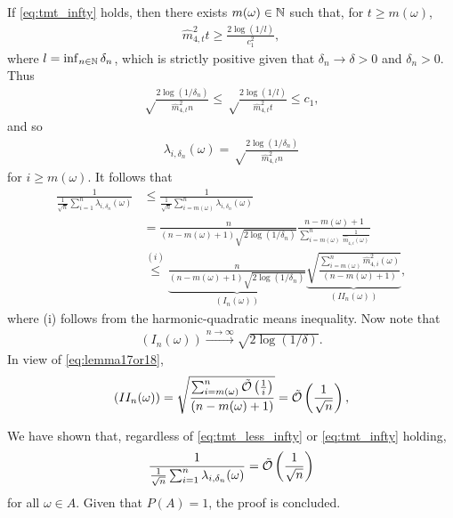     If \eqref{eq:tmt_infty} holds, then there exists $m(\omega) \in \mathbb{N}$ such that, for $t \geq m(\omega)$, 
    \begin{align*}
        \widehat m_{4, t}^2 t \geq \frac{2\log(1/l)}{c_1^2},
    \end{align*}
    where $l = \inf_{n \in \mathbb{N}} \delta_n$, which is strictly positive given that $\delta_n \to \delta > 0$ and $\delta_n >0$. Thus
    \begin{align*}
        \sqrt\frac{2\log(1/\delta_n)}{\widehat m_{4, t}^2 n} \leq \sqrt\frac{2\log(1/l)}{\widehat m_{4, t}^2 t} \leq  c_1,
    \end{align*}
    and so
    \begin{align*}
        \lambda_{i,\delta_n}(\omega) =  \sqrt\frac{2\log(1/\delta_n)}{\widehat m_{4, t}^2 n}
    \end{align*}
    for $i \geq m(\omega)$. It follows that 
    \begin{align*}
        \frac{1}{\frac{1}{\sqrt{n}} \sum_{i = 1}^n \lambda_{i,\delta_n}(\omega)} &\leq \frac{1}{\frac{1}{\sqrt{n}} \sum_{i = m(\omega)}^n \lambda_{i,\delta_n}(\omega)}
        \\&= \frac{n}{(n - m(\omega) + 1)\sqrt{2\log(1/\delta_n)}} \frac{n - m(\omega) + 1}{\sum_{i = m(\omega)}^n \frac{1}{\widehat m_{4, i}(\omega) }}
        \\&\stackrel{(i)}{\leq} \underbrace{\frac{n}{(n - m(\omega) + 1)\sqrt{2\log(1/\delta_n)}}}_{(I_n(\omega))}\underbrace{\sqrt{\frac{\sum_{i = m(\omega)}^n \widehat m_{4, i}^2(\omega) }{(n - m(\omega) + 1)}}}_{(II_n(\omega))},
    \end{align*}
    where (i) follows from the harmonic-quadratic means inequality. Now note that
    \begin{align*}
        (I_n(\omega)) \stackrel{n\to\infty}{\to} \sqrt{2\log(1/\delta)}.
    \end{align*}
    In view of \eqref{eq:lemma17or18},
    \begin{align*}
        (II_n(\omega)) = \sqrt{\frac{\sum_{i = m(\omega)}^n \tilde{\mathcal{O}} \left( \frac{1}{i}\right) }{(n - m(\omega) + 1)}} = \tilde{\mathcal{O}} \left( \frac{1}{\sqrt{n}}\right),
    \end{align*}

    We have shown that, regardless of \eqref{eq:tmt_less_infty} or \eqref{eq:tmt_infty} holding, 
    \begin{align*}
        \frac{1}{\frac{1}{\sqrt{n}} \sum_{i = 1}^n \lambda_{i,\delta_n}(\omega)} = \tilde{\mathcal{O}} \left( \frac{1}{\sqrt{n}}\right)
    \end{align*}
    for all $\omega \in A$. Given that $P(A) = 1$, the proof is concluded.

